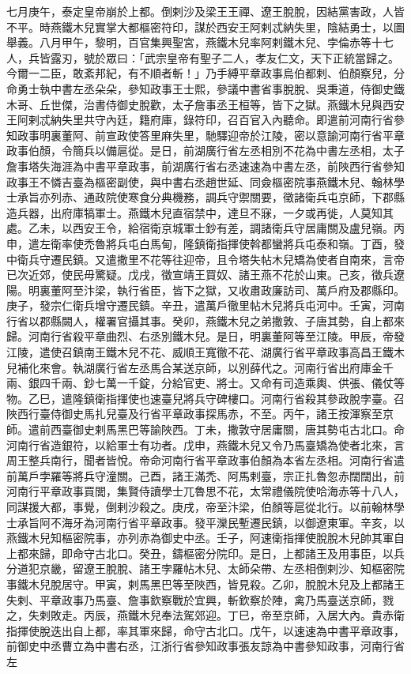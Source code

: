 \begin{pinyinscope}
 七月庚午，泰定皇帝崩於上都。倒剌沙及梁王王禪、遼王脫脫，因結黨害政，人皆不平。時燕鐵木兒實掌大都樞密符印，謀於西安王阿剌忒納失里，陰結勇士，以圖舉義。八月甲午，黎明，百官集興聖宮，燕鐵木兒率阿剌鐵木兒、孛倫赤等十七人，兵皆露刃，號於眾曰：「武宗皇帝有聖子二人，孝友仁文，天下正統當歸之。今爾一二臣，敢紊邦紀，有不順者斬！」乃手縛平章政事烏伯都剌、伯顏察兒，分命勇士執中書左丞朵朵，參知政事王士熙，參議中書省事脫脫、吳秉道，侍御史鐵木哥、丘世傑，治書侍御史脫歡，太子詹事丞王桓等，皆下之獄。燕鐵木兒與西安王阿剌忒納失里共守內廷，籍府庫，錄符印，召百官入內聽命。即遣前河南行省參知政事明裏董阿、前宣政使答里麻失里，馳驛迎帝於江陵，密以意諭河南行省平章政事伯顏，令簡兵以備扈從。是日，前湖廣行省左丞相別不花為中書左丞相，太子詹事塔失海涯為中書平章政事，前湖廣行省右丞速速為中書左丞，前陜西行省參知政事王不憐吉臺為樞密副使，與中書右丞趙世延、同僉樞密院事燕鐵木兒、翰林學士承旨亦列赤、通政院使寒食分典機務，調兵守禦關要，徵諸衛兵屯京師，下郡縣造兵器，出府庫犒軍士。燕鐵木兒直宿禁中，達旦不寐，一夕或再徙，人莫知其處。乙未，以西安王令，給宿衛京城軍士鈔有差，調諸衛兵守居庸關及盧兒嶺。丙申，遣左衛率使禿魯將兵屯白馬甸，隆鎮衛指揮使斡都蠻將兵屯泰和嶺。丁酉，發中衛兵守遷民鎮。又遣撒里不花等往迎帝，且令塔失帖木兒矯為使者自南來，言帝已次近郊，使民毋驚疑。戊戌，徵宣靖王買奴、諸王燕不花於山東。己亥，徵兵遼陽。明裏董阿至汴梁，執行省臣，皆下之獄，又收肅政廉訪司、萬戶府及郡縣印。庚子，發宗仁衛兵增守遷民鎮。辛丑，遣萬戶徹里帖木兒將兵屯河中。壬寅，河南行省以郡縣闕人，權署官攝其事。癸卯，燕鐵木兒之弟撒敦、子唐其勢，自上都來歸。河南行省殺平章曲烈、右丞別鐵木兒。是日，明裏董阿等至江陵。甲辰，帝發江陵，遣使召鎮南王鐵木兒不花、威順王寬徹不花、湖廣行省平章政事高昌王鐵木兒補化來會。執湖廣行省左丞馬合某送京師，以別薛代之。河南行省出府庫金千兩、銀四千兩、鈔七萬一千錠，分給官吏、將士。又命有司造乘輿、供張、儀仗等物。乙巳，遣隆鎮衛指揮使也速臺兒將兵守碑樓口。河南行省殺其參政脫孛臺。召陜西行臺侍御史馬扎兒臺及行省平章政事探馬赤，不至。丙午，諸王按渾察至京師。遣前西臺御史剌馬黑巴等諭陜西。丁未，撒敦守居庸關，唐其勢屯古北口。命河南行省造銀符，以給軍士有功者。戊申，燕鐵木兒又令乃馬臺矯為使者北來，言周王整兵南行，聞者皆悅。帝命河南行省平章政事伯顏為本省左丞相。河南行省遣前萬戶孛羅等將兵守潼關。己酉，諸王滿禿、阿馬剌臺，宗正扎魯忽赤闊闊出，前河南行平章政事買閭，集賢侍讀學士兀魯思不花，太常禮儀院使哈海赤等十八人，同謀援大都，事覺，倒剌沙殺之。庚戌，帝至汴梁，伯顏等扈從北行。以前翰林學士承旨阿不海牙為河南行省平章政事。發平灤民塹遷民鎮，以御遼東軍。辛亥，以燕鐵木兒知樞密院事，亦列赤為御史中丞。壬子，阿速衛指揮使脫脫木兒帥其軍自上都來歸，即命守古北口。癸丑，鑄樞密分院印。是日，上都諸王及用事臣，以兵分道犯京畿，留遼王脫脫、諸王孛羅帖木兒、太師朵帶、左丞相倒剌沙、知樞密院事鐵木兒脫居守。甲寅，剌馬黑巴等至陜西，皆見殺。乙卯，脫脫木兒及上都諸王失剌、平章政事乃馬臺、詹事欽察戰於宜興，斬欽察於陣，禽乃馬臺送京師，戮之，失剌敗走。丙辰，燕鐵木兒奉法駕郊迎。丁巳，帝至京師，入居大內。貴赤衛指揮使脫迭出自上都，率其軍來歸，命守古北口。戊午，以速速為中書平章政事，前御史中丞曹立為中書右丞，江浙行省參知政事張友諒為中書參知政事，河南行省左
\end{pinyinscope}

